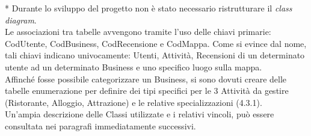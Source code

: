 \documentclass[a4paper,12pt]{article}
\begin{document}
\normalsize{
* Durante lo sviluppo del progetto non è stato necessario ristrutturare il {\it class diagram}.
\vspace*{+0.2cm}
\\Le associazioni tra tabelle avvengono tramite l'uso delle chiavi primarie: CodUtente, CodBusiness, CodRecensione e CodMappa. Come si evince dal nome, tali chiavi indicano univocamente: Utenti, Attività, Recensioni di un determinato utente ad un determinato Business e uno specifico luogo sulla mappa.
\vspace*{+0.2cm}
\\Affinché fosse possibile categorizzare un Business, si sono dovuti creare delle tabelle enumerazione per definire dei tipi specifici per le 3 Attività da gestire (Ristorante, Alloggio, Attrazione) e le relative specializzazioni (4.3.1).
\vspace*{+0.2cm}
\\Un'ampia descrizione delle Classi utilizzate e i relativi vincoli, può essere consultata nei paragrafi immediatamente successivi.
}

\newpage
\end{document}
